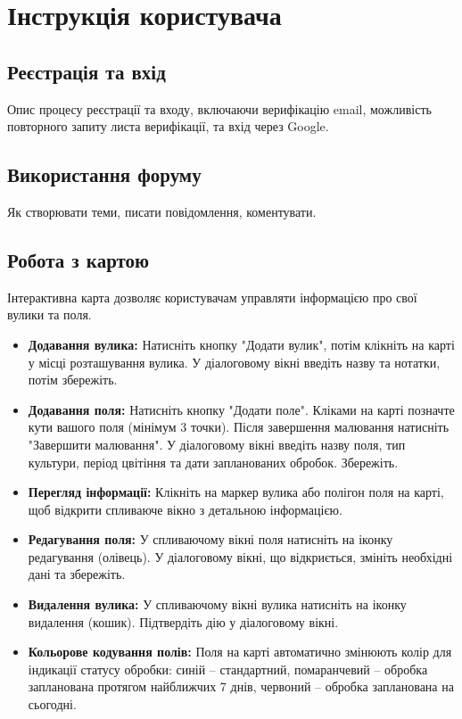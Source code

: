 \chapter{Інструкція користувача}
\label{app:user_manual}

\section*{Реєстрація та вхід}
Опис процесу реєстрації та входу, включаючи верифікацію email, можливість повторного запиту листа верифікації, та вхід через Google.

\section*{Використання форуму}
Як створювати теми, писати повідомлення, коментувати.

\section*{Робота з картою}
Інтерактивна карта дозволяє користувачам управляти інформацією про свої вулики та поля.
\begin{itemize}
    \item \textbf{Додавання вулика:} Натисніть кнопку "Додати вулик", потім клікніть на карті у місці розташування вулика. У діалоговому вікні введіть назву та нотатки, потім збережіть.
    \item \textbf{Додавання поля:} Натисніть кнопку "Додати поле". Кліками на карті позначте кути вашого поля (мінімум 3 точки). Після завершення малювання натисніть "Завершити малювання". У діалоговому вікні введіть назву поля, тип культури, період цвітіння та дати запланованих обробок. Збережіть.
    \item \textbf{Перегляд інформації:} Клікніть на маркер вулика або полігон поля на карті, щоб відкрити спливаюче вікно з детальною інформацією.
    \item \textbf{Редагування поля:} У спливаючому вікні поля натисніть на іконку редагування (олівець). У діалоговому вікні, що відкриється, змініть необхідні дані та збережіть.
    \item \textbf{Видалення вулика:} У спливаючому вікні вулика натисніть на іконку видалення (кошик). Підтвердіть дію у діалоговому вікні.
    \item \textbf{Кольорове кодування полів:} Поля на карті автоматично змінюють колір для індикації статусу обробки: синій – стандартний, помаранчевий – обробка запланована протягом найближчих 7 днів, червоний – обробка запланована на сьогодні.
\end{itemize} 